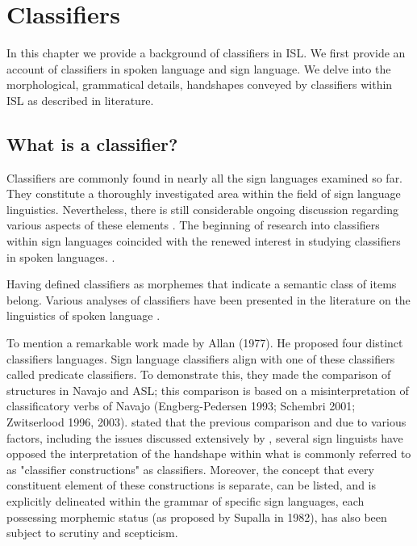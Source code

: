 \chapter{Classifiers}
In this chapter we provide a background of classifiers in ISL. We first provide an 
account of classifiers in spoken language and sign language. We delve into  the 
morphological, grammatical details, handshapes conveyed by classifiers within ISL as 
described in literature. 


\section{What is a classifier?}

Classifiers are commonly found in nearly all the sign languages examined so far. They 
constitute a thoroughly investigated area within the field of sign language 
linguistics. Nevertheless, there is still considerable ongoing discussion regarding 
various aspects of these elements \parencite{zwitserlood2012}.
The beginning of research into classifiers within sign languages coincided with the 
renewed interest in studying classifiers in spoken languages. \parencite{zwitserlood2012}. 

Having defined classifiers as morphemes that indicate a semantic class of items 
belong. Various analyses of classifiers have been presented in the literature on the 
linguistics of spoken language \parencite{morgan2007}. 

To mention a remarkable work made by Allan (1977). He proposed four distinct 
classifiers languages. Sign language classifiers align with one of these classifiers 
called predicate classifiers. To demonstrate this, they made the comparison of 
structures in Navajo and ASL; this comparison is based on a misinterpretation of 
classificatory verbs of Navajo (Engberg-Pedersen 1993; Schembri 2001; Zwitserlood 
1996, 2003). \textcite{vermeerbergen2023} stated that the previous comparison 
and due to various factors, including the issues discussed extensively by \textcite{schembri2003}, several sign linguists have opposed the interpretation of the handshape 
within what is commonly referred to as "classifier constructions" as classifiers. 
Moreover, the concept that every constituent element of these constructions is 
separate, can be listed, and is explicitly delineated within the grammar of specific 
sign languages, each possessing morphemic status (as proposed by Supalla in 1982), 
has also been subject to scrutiny and scepticism.

